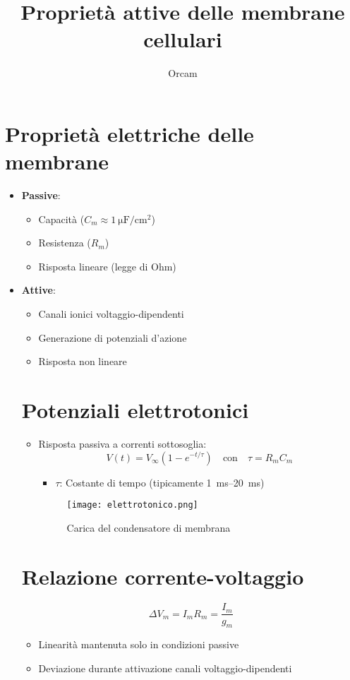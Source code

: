 \documentclass{article}
\title{Proprietà attive delle membrane cellulari}
\author{Orcam}
\date{}
\begin{document}
\maketitle

\section{Proprietà elettriche delle membrane}
\begin{itemize}
\item \textbf{Passive}:
  \begin{itemize}
  \item Capacità (\(C_m \approx \SI{1}{\micro\farad\per\centi\meter\squared}\))
  \item Resistenza (\(R_m\))
  \item Risposta lineare (legge di Ohm)
  \end{itemize}

\item \textbf{Attive}:
  \begin{itemize}
  \item Canali ionici voltaggio-dipendenti
  \item Generazione di potenziali d'azione
  \item Risposta non lineare
  \end{itemize}

\section{Potenziali elettrotonici}
\begin{itemize}
\item Risposta passiva a correnti sottosoglia:
\[
V(t) = V_{\infty} \left(1 - e^{-t/\tau}\right) \quad \text{con} \quad \tau = R_m C_m
\]
\begin{itemize}
\item \(\tau\): Costante di tempo (tipicamente \SIrange{1}{20}{\milli\second})
\end{itemize}

\begin{figure}[h]
\centering
\texttt{[image: elettrotonico.png]}
\caption{Carica del condensatore di membrana}
\label{fig:elettrotonico}
\end{figure}
\end{itemize}

\section{Relazione corrente-voltaggio}
\[
\Delta V_m = I_m R_m = \frac{I_m}{g_m}
\]
\begin{itemize}
\item Linearità mantenuta solo in condizioni passive
\item Deviazione durante attivazione canali voltaggio-dipendenti


\end{itemize}
\end{itemize}
\end{document}
